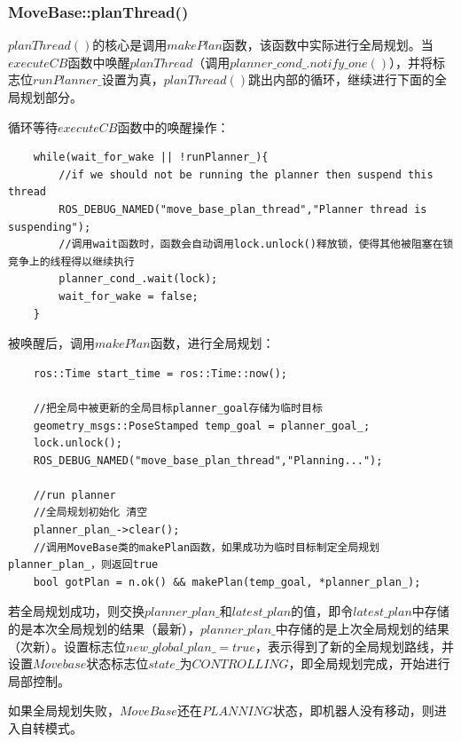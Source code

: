 \documentclass[9pt, oneside]{book}
\begin{document}
\subsubsection{MoveBase::planThread()}

$planThread()$的核心是调用$makePlan$函数，该函数中实际进行全局规划。当$executeCB$函数中唤醒$planThread$（调用$planner\_cond\_.notify\_one()$），并将标志位$runPlanner\_$设置为真，$planThread()$跳出内部的循环，继续进行下面的全局规划部分。

循环等待$executeCB$函数中的唤醒操作：

\footnotesize
\begin{verbatim}
    while(wait_for_wake || !runPlanner_){
        //if we should not be running the planner then suspend this thread
        ROS_DEBUG_NAMED("move_base_plan_thread","Planner thread is suspending");
        //调用wait函数时，函数会自动调用lock.unlock()释放锁，使得其他被阻塞在锁竞争上的线程得以继续执行
        planner_cond_.wait(lock);
        wait_for_wake = false;
    }
\end{verbatim}
\normalsize

被唤醒后，调用$makePlan$函数，进行全局规划：

\footnotesize
\begin{verbatim}
    ros::Time start_time = ros::Time::now();

    //把全局中被更新的全局目标planner_goal存储为临时目标
    geometry_msgs::PoseStamped temp_goal = planner_goal_;
    lock.unlock();
    ROS_DEBUG_NAMED("move_base_plan_thread","Planning...");

    //run planner
    //全局规划初始化 清空
    planner_plan_->clear();
    //调用MoveBase类的makePlan函数，如果成功为临时目标制定全局规划planner_plan_，则返回true
    bool gotPlan = n.ok() && makePlan(temp_goal, *planner_plan_);
\end{verbatim}
\normalsize

若全局规划成功，则交换$planner\_plan\_$和$latest\_plan$的值，即令$latest\_plan$中存储的是本次全局规划的结果（最新），$planner\_plan\_$中存储的是上次全局规划的结果（次新）。设置标志位$new\_global\_plan\_ = true$，表示得到了新的全局规划路线，并设置$Movebase$状态标志位$state\_$为$CONTROLLING$，即全局规划完成，开始进行局部控制。

如果全局规划失败，$MoveBase$还在$PLANNING$状态，即机器人没有移动，则进入自转模式。
\end{document}

